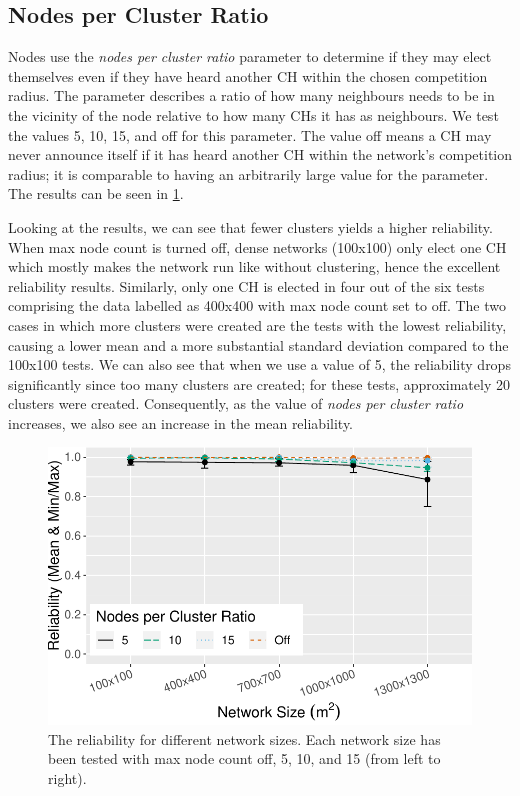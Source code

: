 \subsection{Nodes per Cluster Ratio}
Nodes use the \emph{nodes per cluster ratio} parameter to determine if they may elect themselves even if they have heard another CH within the chosen competition radius. The parameter describes a ratio of how many neighbours needs to be in the vicinity of the node relative to how many CHs it has as neighbours. We test the values 5, 10, 15, and off for this parameter. The value off means a CH may never announce itself if it has heard another CH within the network's competition radius; it is comparable to having an arbitrarily large value for the parameter. The results can be seen in \cref{fig:nodes-per-cluster-ratio-reliability}.

Looking at the results, we can see that fewer clusters yields a higher reliability. When max node count is turned off, dense networks (100x100) only elect one CH which mostly makes the network run like \atwo{} without clustering, hence the excellent reliability results. Similarly, only one CH is elected in four out of the six tests comprising the data labelled as 400x400 with max node count set to off. The two cases in which more clusters were created are the tests with the lowest reliability, causing a lower mean and a more substantial standard deviation compared to the 100x100 tests. We can also see that when we use a value of 5, the reliability drops significantly since too many clusters are created; for these tests, approximately 20 clusters were created. Consequently, as the value of \emph{nodes per cluster ratio} increases, we also see an increase in the mean reliability.



\begin{figure}[bt]
    \centering
    \includegraphics[width=\textwidth, keepaspectratio]{figure/Results/ParameterEvaluation/MaxNodeCount_Reliability.pdf}
    \caption{The reliability for different network sizes. Each network size has been tested with max node count off, 5, 10, and 15 (from left to right).}
    \label{fig:nodes-per-cluster-ratio-reliability}
\end{figure}



